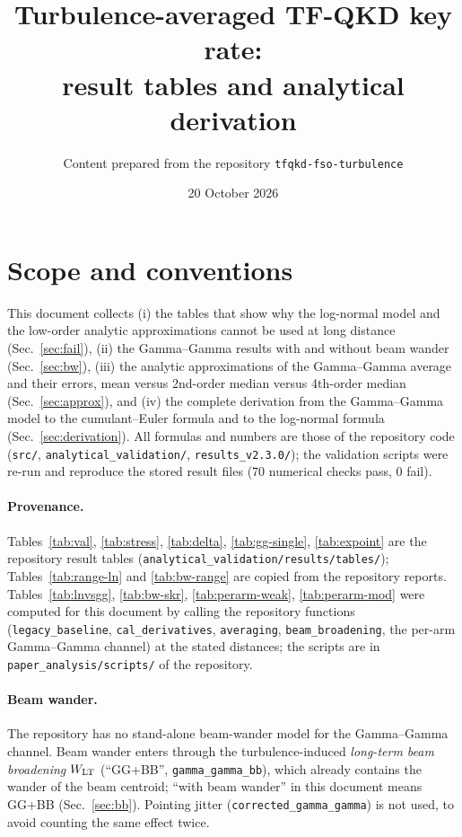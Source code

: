 \documentclass[11pt,a4paper]{article}
\title{Turbulence-averaged TF-QKD key rate:\\ result tables and analytical derivation}
\author{Content prepared from the repository \texttt{tfqkd-fso-turbulence}}
\date{20 October 2026}
\theoremstyle{plain}
\theoremstyle{remark}
\begin{document}
\maketitle

\section{Scope and conventions}
This document collects (i) the tables that show why the log-normal model and the low-order analytic approximations cannot be used at long distance (Sec.~\ref{sec:fail}), (ii) the Gamma--Gamma results with and without beam wander (Sec.~\ref{sec:bw}), (iii) the analytic approximations of the Gamma--Gamma average and their errors, mean versus 2nd-order median versus 4th-order median (Sec.~\ref{sec:approx}), and (iv) the complete derivation from the Gamma--Gamma model to the cumulant--Euler formula and to the log-normal formula (Sec.~\ref{sec:derivation}). All formulas and numbers are those of the repository code (\texttt{src/}, \texttt{analytical\_validation/}, \texttt{results\_v2.3.0/}); the validation scripts were re-run and reproduce the stored result files (70 numerical checks pass, 0 fail).

\paragraph{Provenance.} Tables~\ref{tab:val}, \ref{tab:stress}, \ref{tab:delta}, \ref{tab:gg-single}, \ref{tab:expoint} are the repository result tables (\texttt{analytical\_validation/results/tables/}); Tables~\ref{tab:range-ln} and \ref{tab:bw-range} are copied from the repository reports. Tables~\ref{tab:lnvsgg}, \ref{tab:bw-skr}, \ref{tab:perarm-weak}, \ref{tab:perarm-mod} were computed for this document by calling the repository functions (\texttt{legacy\_baseline}, \texttt{cal\_derivatives}, \texttt{averaging}, \texttt{beam\_broadening}, the per-arm Gamma--Gamma channel) at the stated distances; the scripts are in \texttt{paper\_analysis/scripts/} of the repository.

\paragraph{Beam wander.} The repository has no stand-alone beam-wander model for the Gamma--Gamma channel. Beam wander enters through the turbulence-induced \emph{long-term beam broadening} $W_{\rm LT}$ (``GG+BB'', \texttt{gamma\_gamma\_bb}), which already contains the wander of the beam centroid; ``with beam wander'' in this document means GG+BB (Sec.~\ref{sec:bb}). Pointing jitter (\texttt{corrected\_gamma\_gamma}) is not used, to avoid counting the same effect twice.
\end{document}
